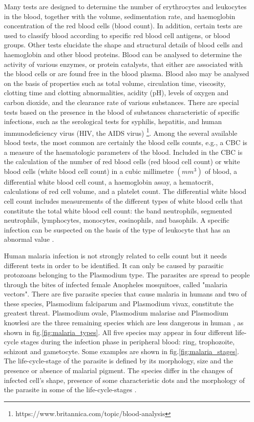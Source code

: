 \documentclass[sensors,review,submit,moreauthors,pdftex,10pt,a4paper]{mdpi}
\begin{document}
	Many tests are designed to determine the number of erythrocytes and leukocytes in the blood, together with the volume, sedimentation rate, and haemoglobin concentration of the red blood cells (blood count). In addition, certain tests are used to classify blood according to specific red blood cell antigens, or blood groups. Other tests elucidate the shape and structural details of blood cells and haemoglobin and other blood proteins. Blood can be analysed to determine the activity of various enzymes, or protein catalysts, that either are associated with the blood cells or are found free in the blood plasma.
	Blood also may be analysed on the basis of properties such as total volume, circulation time, viscosity, clotting time and clotting abnormalities, acidity (pH), levels of oxygen and carbon dioxide, and the clearance rate of various substances. There are special tests based on the presence in the blood of substances characteristic of specific infections, such as the serological tests for syphilis, hepatitis, and human immunodeficiency virus (HIV, the AIDS virus) \footnote{https://www.britannica.com/topic/blood-analysis}.
	Among the several available blood tests, the most common are certainly the blood cells counts, e.g., a CBC is a measure of the haematologic parameters of the blood. Included in the CBC is the calculation of the number of red blood cells (red blood cell count) or white blood cells (white blood cell count) in a cubic millimetre $(mm^{3})$ of blood, a differential white blood cell count, a haemoglobin assay, a hematocrit, calculations of red cell volume, and a platelet count. The differential white blood cell count includes measurements of the different types of white blood cells that constitute the total white blood cell count: the band neutrophils, segmented neutrophils, lymphocytes, monocytes, eosinophils, and basophils. A specific infection can be suspected on the basis of the type of leukocyte that has an abnormal value \cite{DiRuberto2016}.
	
	Human malaria infection is not strongly related to cells count but it needs different tests in order to be identified. It can only be caused by parasitic protozoans belonging to the Plasmodium type. The parasites are spread to people through the bites of infected female Anopheles mosquitoes, called "malaria vectors".
	There are five parasite species that cause malaria in humans and two of these species, Plasmodium falciparum and Plasmodium vivax, constitute the greatest threat. Plasmodium ovale, Plasmodium malariae and Plasmodium knowlesi are the three remaining species which are less dangerous in human \cite{WHO_dec_2016}, as shown in fig.\ref{fig:malaria_types}.
	All five species may appear in four different life-cycle stages during the infection phase in peripheral blood: ring, trophozoite, schizont and gametocyte. Some examples are shown in fig.\ref{fig:malaria_stages}.
	The life-cycle-stage of the parasite is defined by its morphology, size and the presence or absence of malarial pigment.
	The species differ in the changes of infected cell's shape, presence of some characteristic dots and the morphology of the parasite in some of the life-cycle-stages \cite{Somasekar2011}.
	
\end{document}
